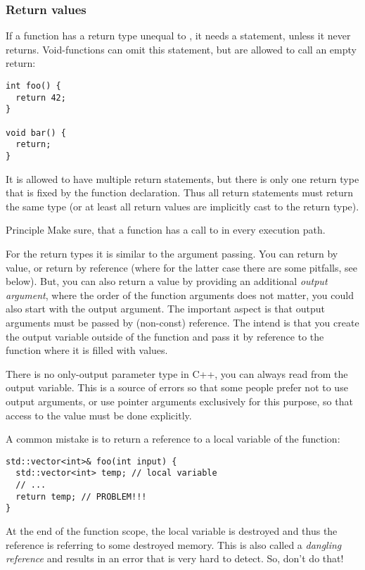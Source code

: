 \subsubsection{Return values}
If a function has a return type unequal to , it needs a  statement, unless it never returns. Void-functions can omit this statement, but are allowed to
call an empty return:
\begin{verbatim}
int foo() {
  return 42;
}

void bar() {
  return;
}
\end{verbatim}

It is allowed to have multiple return statements, but there is only one return type that is fixed by the function declaration. Thus all return statements
must return the same type (or at least all return values are implicitly cast to the return type).

\begin{guideline}{Principle}
  Make sure, that a function has a call to  in every execution path.
\end{guideline}

For the return types it is similar to the argument passing. You can return by value, or return by reference (where for the latter case there
are some pitfalls, see below). But, you can also return a value by providing an additional \emph{output argument}, \eg
%
%
where the order of the function arguments does not matter, \ie you could also start with the output argument. The important aspect is that
output arguments must be passed by (non-const) reference. The intend is that you create the output variable outside of the function and pass it by
reference to the function where it is filled with values.

\begin{rem}
  There is no only-output parameter type in C++, you can always read from the output variable. This is a source of errors so that some people prefer
  not to use output arguments, or use pointer arguments exclusively for this purpose, so that access to the value must be done explicitly.
\end{rem}

A common mistake is to return a reference to a local variable of the function:
\begin{verbatim}
std::vector<int>& foo(int input) {
  std::vector<int> temp; // local variable
  // ...
  return temp; // PROBLEM!!!
}
\end{verbatim}
At the end of the function scope, the local variable is destroyed and thus the reference is referring to some destroyed memory. This is also
called a \emph{dangling reference} and results in an error that is very hard to detect. So, don't do that!

